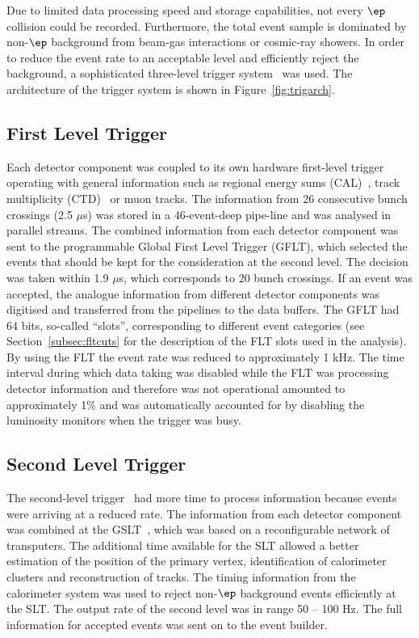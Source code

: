 Due to limited data processing speed and storage capabilities, not every $\ep$ collision could be recorded. Furthermore, the total event sample is dominated by non-$\ep$ background from beam-gas interactions or cosmic-ray showers. In order to reduce the event rate to an acceptable level and efficiently reject the background, a sophisticated three-level trigger system~\cite{Smith:1992im,nim:a379:542,Carlin:1995rv} was used. The architecture of the \zeus trigger system is shown in Figure~\ref{fig:trigarch}. 

\subsection{First Level Trigger}
\label{subsec:flt} Each detector component was coupled to its own hardware first-level trigger operating with general information such as regional energy sums (CAL)~\cite{nim:a355:278}, track multiplicity (CTD)~\cite{nim:a315:431} or muon tracks. The information from 26 consecutive bunch crossings (2.5 $\mu$s) was stored in a 46-event-deep pipe-line and was analysed in parallel streams. The combined information from each detector component was sent to the programmable Global First Level Trigger (GFLT), which selected the events that should be kept for the consideration at the second level. The decision was taken within 1.9 $\mu$s, which corresponds to 20 bunch crossings. If an event was accepted, the analogue information from different detector components was digitised and transferred from the pipelines to the data buffers. The GFLT had 64 bits, so-called ``slots'', corresponding to different event categories (see Section~\ref{subsec:fltcuts} for the description of the FLT slots used in the analysis). By using the FLT the event rate was reduced to approximately 1 kHz. The time interval during which data taking was disabled while the FLT was processing detector information and therefore was not operational amounted to approximately 1\% and was automatically accounted for by disabling the luminosity monitors when the trigger was busy.

\subsection{Second Level Trigger}
\label{subsec:slt}
The second-level trigger~\cite{Allfrey:2007zz} had more time to process information because events were arriving at a reduced rate. The information from each detector component was combined at the GSLT~\cite{upub:abbiendi:zn99063,upub:chlebana:zn94102,Uijterwaal:1992xc}, which was based on a reconfigurable network of transputers. The additional time available for the SLT allowed a better estimation of the position of the primary vertex, identification of  calorimeter clusters and reconstruction of tracks. The timing information from the calorimeter system was used to reject non-$\ep$ background events efficiently at the SLT. The output rate of the second level was in range 50 -- 100 Hz. The full information for accepted events was sent on to the event builder.

